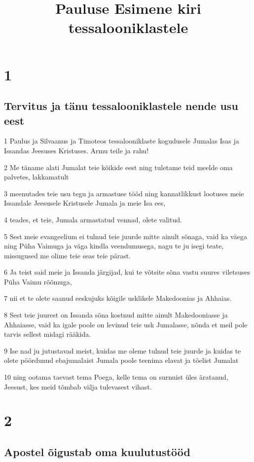 

\title{Pauluse Esimene kiri tessalooniklastele}

\chapter{1}

\section*{Tervitus ja tänu tessalooniklastele nende usu eest}

\par 1 Paulus ja Silvaanus ja Timoteos tessalooniklaste kogudusele Jumalas Isas ja Issandas Jeesuses Kristuses. Armu teile ja rahu!
\par 2 Me täname alati Jumalat teie kõikide eest ning tuletame teid meelde oma palvetes, lakkamatult
\par 3 meenutades teie usu tegu ja armastuse tööd ning kannatlikkust lootuses meie Issandale Jeesusele Kristusele Jumala ja meie Isa ees,
\par 4 teades, et teie, Jumala armastatud vennad, olete valitud.
\par 5 Sest meie evangeelium ei tulnud teie juurde mitte ainult sõnaga, vaid ka väega ning Püha Vaimuga ja väga kindla veendumusega, nagu te ju isegi teate, missugused me olime teie seas teie pärast.
\par 6 Ja teist said meie ja Issanda järgijad, kui te võtsite sõna vastu suures viletsuses Püha Vaimu rõõmuga,
\par 7 nii et te olete saanud eeskujuks kõigile usklikele Makedoonias ja Ahhaias.
\par 8 Sest teie juurest on Issanda sõna kostnud mitte ainult Makedooniasse ja Ahhaiasse, vaid ka igale poole on levinud teie usk Jumalasse, nõnda et meil pole tarvis sellest midagi rääkida.
\par 9 Ise nad ju jutustavad meist, kuidas me oleme tulnud teie juurde ja kuidas te olete pöördunud ebajumalaist Jumala poole teenima elavat ja tõelist Jumalat
\par 10 ning ootama taevast tema Poega, kelle tema on surnuist üles äratanud, Jeesust, kes meid tõmbab välja tulevasest vihast.


\chapter{2}

\section*{Apostel õigustab oma kuulutustööd}

